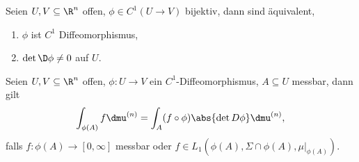 \begin{prop}
\label{prop:3.58}
Seien $U,V\subseteq\R^n$ offen, $\phi\in C^1(U\to V)$ bijektiv, dann sind
äquivalent,
\begin{enumerate}[label=(\roman{*})]
  \item $\phi$ ist $C^1$ Diffeomorphismus,
  \item $\det \D\phi\neq 0$ auf $U$.\fishhere
\end{enumerate}
\end{prop}

\begin{prop}[Transformationssatz]
\label{prop:3.59}
Seien $U,V\subseteq\R^n$ offen, $\phi: U\to V$ ein $C^1$-Diffeomorphismus,
$A\subseteq U$ messbar, dann gilt
\begin{align*}
\int_{\phi(A)} f\dmu^{(n)} = \int_A (f\circ \phi) \abs{\det D\phi} \dmu^{(n)},
\end{align*}
falls $f: \phi(A)\to[0,\infty]$ messbar oder $f\in L_1(\phi(A),\Sigma\cap
\phi(A),\mu\big|_{\phi(A)})$.\fishhere
\end{prop}

